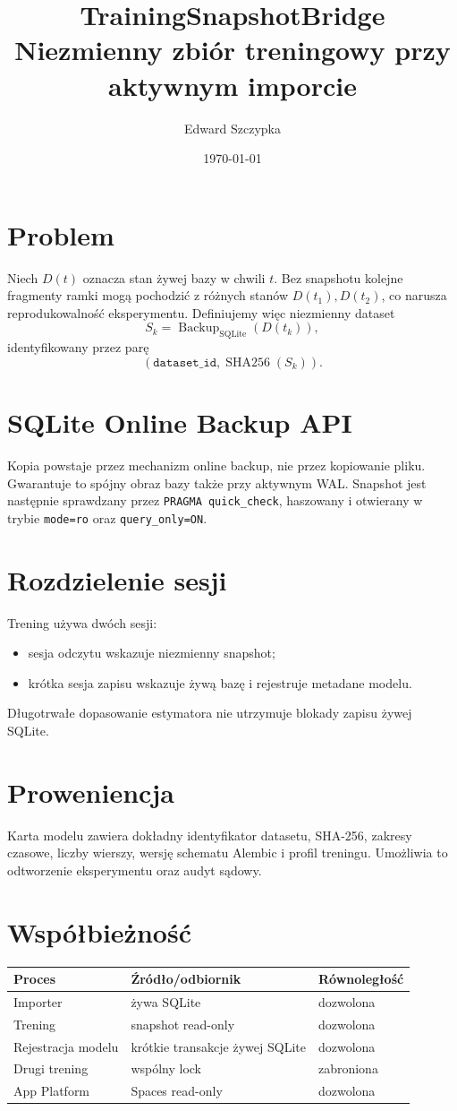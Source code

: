 \documentclass[11pt,a4paper]{article}
\title{TrainingSnapshotBridge\\Niezmienny zbiór treningowy przy aktywnym imporcie}
\author{Edward Szczypka}
\date{\today}
\begin{document}
\maketitle

\section{Problem}
Niech $D(t)$ oznacza stan żywej bazy w chwili $t$. Bez snapshotu kolejne
fragmenty ramki mogą pochodzić z różnych stanów $D(t_1),D(t_2)$, co narusza
reprodukowalność eksperymentu. Definiujemy więc niezmienny dataset
\[
  S_k = \operatorname{Backup}_{\mathrm{SQLite}}(D(t_k)),
\]
identyfikowany przez parę
\[
  (\texttt{dataset\_id},\operatorname{SHA256}(S_k)).
\]

\section{SQLite Online Backup API}
Kopia powstaje przez mechanizm online backup, nie przez kopiowanie pliku.
Gwarantuje to spójny obraz bazy także przy aktywnym WAL. Snapshot jest następnie
sprawdzany przez \texttt{PRAGMA quick\_check}, haszowany i otwierany w trybie
\texttt{mode=ro} oraz \texttt{query\_only=ON}.

\section{Rozdzielenie sesji}
Trening używa dwóch sesji:
\begin{itemize}
  \item sesja odczytu wskazuje niezmienny snapshot;
  \item krótka sesja zapisu wskazuje żywą bazę i rejestruje metadane modelu.
\end{itemize}
Długotrwałe dopasowanie estymatora nie utrzymuje blokady zapisu żywej SQLite.

\section{Proweniencja}
Karta modelu zawiera dokładny identyfikator datasetu, SHA-256, zakresy czasowe,
liczby wierszy, wersję schematu Alembic i profil treningu. Umożliwia to
odtworzenie eksperymentu oraz audyt sądowy.

\section{Współbieżność}
\begin{center}
\begin{tabular}{lll}
\toprule
Proces & Źródło/odbiornik & Równoległość \\
\midrule
Importer & żywa SQLite & dozwolona \\
Trening & snapshot read-only & dozwolona \\
Rejestracja modelu & krótkie transakcje żywej SQLite & dozwolona \\
Drugi trening & wspólny lock & zabroniona \\
App Platform & Spaces read-only & dozwolona \\
\bottomrule
\end{tabular}
\end{center}
\end{document}
